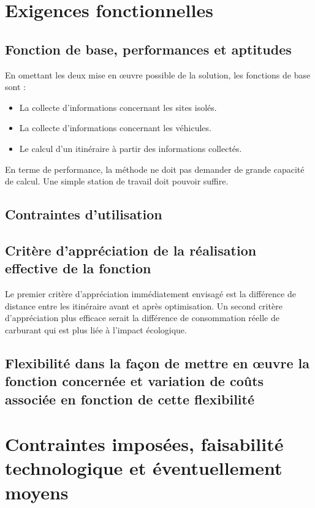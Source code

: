\section{Exigences fonctionnelles}

    \subsection{Fonction de base, performances et aptitudes}

        En omettant les deux mise en œuvre possible de la solution, les fonctions de base sont :
        \begin{itemize}
            \item La collecte d'informations concernant les sites isolés.
            \item La collecte d'informations concernant les véhicules.
            \item Le calcul d'un itinéraire à partir des informations collectés.
        \end{itemize}
        
        En terme de performance, la méthode ne doit pas demander de grande capacité de calcul.
        Une simple station de travail doit pouvoir suffire.

    \subsection{Contraintes d'utilisation}
    
    
    \subsection{Critère d'appréciation de la réalisation effective de la fonction}
    
        Le premier critère d'appréciation immédiatement envisagé est la différence de distance entre les itinéraire avant et après optimisation.
        Un second critère d'appréciation plus efficace serait la différence de consommation réelle de carburant qui est plus liée à l'impact écologique.
    
    \subsection{Flexibilité dans la façon de mettre en œuvre la fonction concernée et variation de coûts associée en fonction de cette flexibilité}

\section{Contraintes imposées, faisabilité technologique et éventuellement moyens}


